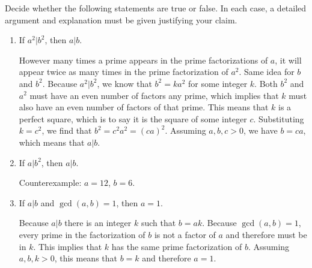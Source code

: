 \documentclass[nooutcomes]{ximera}
\begin{document}
\begin{problem}
\label{P:helper} Decide whether the following statements are true
  or false. In each case, a detailed argument and explanation must be
  given justifying your claim.
\begin{enumerate}
\item If $a^2|b^2$, then $a|b$.  
\begin{hint}However many times a prime appears in the prime factorizations of $a$, it will appear twice as many times in the prime factorization of $a^2$.  Same idea for $b$ and $b^2$. 
Because $a^2|b^2$, we know that $b^2=ka^2$ for some integer $k$.  
Both $b^2$ and $a^2$ must have an even number of factors any prime, which implies that $k$ must also have an even number of factors of that prime.  
This means that $k$ is a perfect square, which is to say it is the square of some integer $c$.  Substituting $k=c^2$, we find that $b^2=c^2a^2=(ca)^2$.  Assuming $a, b, c > 0$, we have $b=ca$, which means that $a|b$.
\end{hint}
\item If $a|b^2$, then $a|b$.  
  \begin{hint}Counterexample: $a=12$, $b=6$.\end{hint}
\item If $a|b$ and $\gcd(a,b) = 1$, then $a = 1$.  
  \begin{hint}Because $a|b$ there is an integer $k$ such that $b=ak$.  Because $\gcd(a,b) = 1$, every prime in the factorization of $b$ is not a factor of $a$ and therefore must be in $k$.  This implies that $k$ has the same prime factorization of $b$.  Assuming $a, b, k>0$, this means that $b=k$ and therefore $a=1$.\end{hint}
\end{enumerate}
\end{problem}

%
\end{document}
